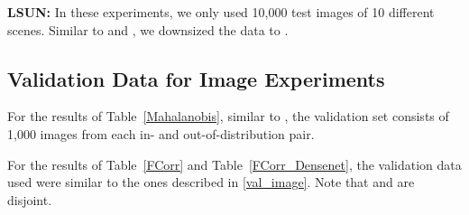 \documentclass{article} \usepackage{iclr2020_conference,times}
\begin{document}
\textbf{LSUN: }In these experiments, we only used 10,000 test images of 10 different scenes. Similar to \cite{Lee:2018:SUF:3327757.3327819} and \cite{ch2019detecting}, we downsized the data to .


\subsection{Validation Data for Image Experiments}\label{post_val_image}
For the results of Table~\ref{Mahalanobis}, similar to \cite{Lee:2018:SUF:3327757.3327819}, the validation set consists of 1,000 images from each in- and out-of-distribution pair.

For the results of Table~\ref{FCorr} and Table~\ref{FCorr_Densenet}, the validation data used were similar to the ones described in \ref{val_image}. Note that  and  are disjoint.
\end{document}
